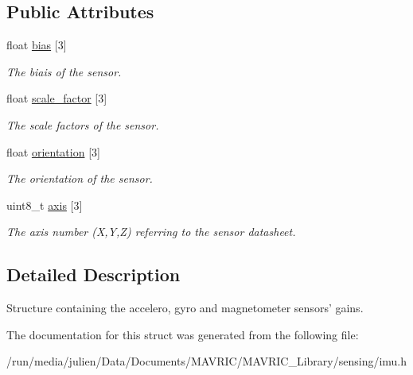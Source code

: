 \subsection*{Public Attributes}
\begin{DoxyCompactItemize}
\item 
\hypertarget{structsensor__calib__t_a9ee603e573d9262922fb37941f214efa}{float \hyperlink{structsensor__calib__t_a9ee603e573d9262922fb37941f214efa}{bias} \mbox{[}3\mbox{]}}\label{structsensor__calib__t_a9ee603e573d9262922fb37941f214efa}

\begin{DoxyCompactList}\small\item\em The biais of the sensor. \end{DoxyCompactList}\item 
\hypertarget{structsensor__calib__t_a1e09ff1e4d71be1f50818d023bd4d2d9}{float \hyperlink{structsensor__calib__t_a1e09ff1e4d71be1f50818d023bd4d2d9}{scale\+\_\+factor} \mbox{[}3\mbox{]}}\label{structsensor__calib__t_a1e09ff1e4d71be1f50818d023bd4d2d9}

\begin{DoxyCompactList}\small\item\em The scale factors of the sensor. \end{DoxyCompactList}\item 
\hypertarget{structsensor__calib__t_a456ea90e8604fde25fdcd6313f18df87}{float \hyperlink{structsensor__calib__t_a456ea90e8604fde25fdcd6313f18df87}{orientation} \mbox{[}3\mbox{]}}\label{structsensor__calib__t_a456ea90e8604fde25fdcd6313f18df87}

\begin{DoxyCompactList}\small\item\em The orientation of the sensor. \end{DoxyCompactList}\item 
\hypertarget{structsensor__calib__t_abb762eeb394be9f09ef1e1db8915ac2c}{uint8\+\_\+t \hyperlink{structsensor__calib__t_abb762eeb394be9f09ef1e1db8915ac2c}{axis} \mbox{[}3\mbox{]}}\label{structsensor__calib__t_abb762eeb394be9f09ef1e1db8915ac2c}

\begin{DoxyCompactList}\small\item\em The axis number (X,Y,Z) referring to the sensor datasheet. \end{DoxyCompactList}\end{DoxyCompactItemize}


\subsection{Detailed Description}
Structure containing the accelero, gyro and magnetometer sensors' gains. 

The documentation for this struct was generated from the following file\+:\begin{DoxyCompactItemize}
\item 
/run/media/julien/\+Data/\+Documents/\+M\+A\+V\+R\+I\+C/\+M\+A\+V\+R\+I\+C\+\_\+\+Library/sensing/imu.\+h\end{DoxyCompactItemize}
